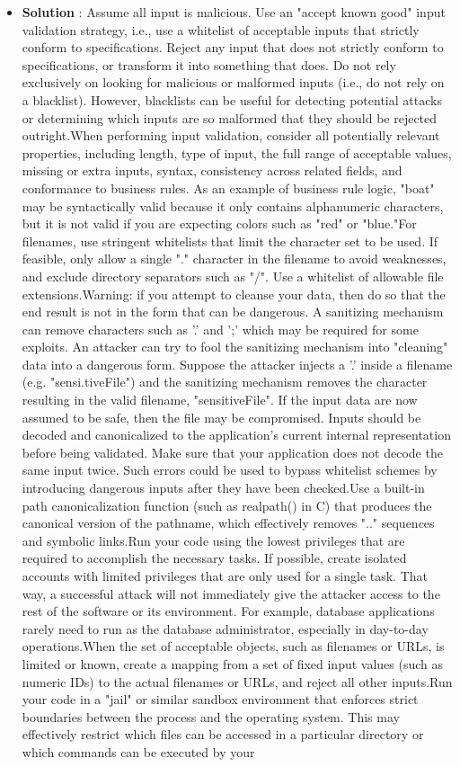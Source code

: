 \documentclass[10pt]{article}
\begin{document}
\begin{itemize}
\item[] \textbf{Solution} :  Assume all input is malicious. Use an "accept known good" input validation strategy, i.e., use a whitelist of acceptable inputs that strictly conform to specifications. Reject any input that does not strictly conform to specifications, or transform it into something that does. Do not rely exclusively on looking for malicious or malformed inputs (i.e., do not rely on a blacklist). However, blacklists can be useful for detecting potential attacks or determining which inputs are so malformed that they should be rejected outright.When performing input validation, consider all potentially relevant properties, including length, type of input, the full range of acceptable values, missing or extra inputs, syntax, consistency across related fields, and conformance to business rules. As an example of business rule logic, "boat" may be syntactically valid because it only contains alphanumeric characters, but it is not valid if you are expecting colors such as "red" or "blue."For filenames, use stringent whitelists that limit the character set to be used. If feasible, only allow a single "." character in the filename to avoid weaknesses, and exclude directory separators such as "/". Use a whitelist of allowable file extensions.Warning: if you attempt to cleanse your data, then do so that the end result is not in the form that can be dangerous. A sanitizing mechanism can remove characters such as '.' and ';' which may be required for some exploits. An attacker can try to fool the sanitizing mechanism into "cleaning" data into a dangerous form. Suppose the attacker injects a '.' inside a filename (e.g. "sensi.tiveFile") and the sanitizing mechanism removes the character resulting in the valid filename, "sensitiveFile". If the input data are now assumed to be safe, then the file may be compromised. Inputs should be decoded and canonicalized to the application's current internal representation before being validated. Make sure that your application does not decode the same input twice. Such errors could be used to bypass whitelist schemes by introducing dangerous inputs after they have been checked.Use a built-in path canonicalization function (such as realpath() in C) that produces the canonical version of the pathname, which effectively removes ".." sequences and symbolic links.Run your code using the lowest privileges that are required to accomplish the necessary tasks. If possible, create isolated accounts with limited privileges that are only used for a single task. That way, a successful attack will not immediately give the attacker access to the rest of the software or its environment. For example, database applications rarely need to run as the database administrator, especially in day-to-day operations.When the set of acceptable objects, such as filenames or URLs, is limited or known, create a mapping from a set of fixed input values (such as numeric IDs) to the actual filenames or URLs, and reject all other inputs.Run your code in a "jail" or similar sandbox environment that enforces strict boundaries between the process and the operating system. This may effectively restrict which files can be accessed in a particular directory or which commands can be executed by your 
\end{itemize}
\end{document}
